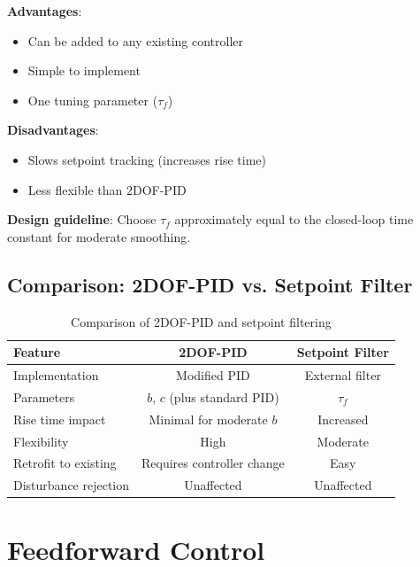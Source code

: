 \textbf{Advantages}:
\begin{itemize}
    \item Can be added to any existing controller
    \item Simple to implement
    \item One tuning parameter ($\tau_f$)
\end{itemize}

\textbf{Disadvantages}:
\begin{itemize}
    \item Slows setpoint tracking (increases rise time)
    \item Less flexible than 2DOF-PID
\end{itemize}

\textbf{Design guideline}: Choose $\tau_f$ approximately equal to the closed-loop time constant for moderate smoothing.

\subsection{Comparison: 2DOF-PID vs. Setpoint Filter}
\label{subsec:2dof_vs_filter}

\begin{table}[htbp]
\centering
\caption{Comparison of 2DOF-PID and setpoint filtering}
\label{tab:2dof_vs_filter}
\begin{tabular}{@{}lcc@{}}
\toprule
\textbf{Feature} & \textbf{2DOF-PID} & \textbf{Setpoint Filter} \\
\midrule
Implementation & Modified PID & External filter \\
Parameters & $b$, $c$ (plus standard PID) & $\tau_f$ \\
Rise time impact & Minimal for moderate $b$ & Increased \\
Flexibility & High & Moderate \\
Retrofit to existing & Requires controller change & Easy \\
Disturbance rejection & Unaffected & Unaffected \\
\bottomrule
\end{tabular}
\end{table}

\section{Feedforward Control}
\label{sec:feedforward}


